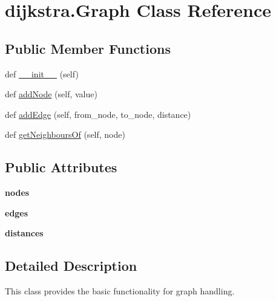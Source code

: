 \hypertarget{classdijkstra_1_1Graph}{}\section{dijkstra.\+Graph Class Reference}
\label{classdijkstra_1_1Graph}
\subsection*{Public Member Functions}
\begin{DoxyCompactItemize}
\item 
def \hyperlink{classdijkstra_1_1Graph_aa955c424e2a20bd9f14be70d19edb1f6}{\+\_\+\+\_\+init\+\_\+\+\_\+} (self)
\item 
def \hyperlink{classdijkstra_1_1Graph_a201ad57b6d07d81c2ae3daf867ec0d56}{add\+Node} (self, value)
\item 
def \hyperlink{classdijkstra_1_1Graph_a2103bc1772ccd6f2ffd5eb5788ce070a}{add\+Edge} (self, from\+\_\+node, to\+\_\+node, distance)
\item 
def \hyperlink{classdijkstra_1_1Graph_aa23d7edee0ff2e856b55fd22c1485338}{get\+Neighbours\+Of} (self, node)
\end{DoxyCompactItemize}
\subsection*{Public Attributes}
\begin{DoxyCompactItemize}
\item 
{\bfseries nodes}\hypertarget{classdijkstra_1_1Graph_a85596c2cd35f388937e5c72c9eb5fb9c}{}\label{classdijkstra_1_1Graph_a85596c2cd35f388937e5c72c9eb5fb9c}

\item 
{\bfseries edges}\hypertarget{classdijkstra_1_1Graph_ad50006bfb53462f323ef29124202f3d7}{}\label{classdijkstra_1_1Graph_ad50006bfb53462f323ef29124202f3d7}

\item 
{\bfseries distances}\hypertarget{classdijkstra_1_1Graph_ab5b849f368ae864e58e5be94a5ac1b16}{}\label{classdijkstra_1_1Graph_ab5b849f368ae864e58e5be94a5ac1b16}

\end{DoxyCompactItemize}


\subsection{Detailed Description}
\begin{DoxyVerb}This class provides the basic functionality for graph handling.\end{DoxyVerb}
 

